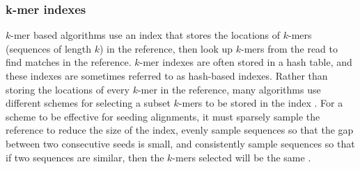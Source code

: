 \documentclass[11pt]{ucscthesis}
\begin{document}



\subsubsection{k-mer indexes}

$k$-mer based algorithms use an index that stores the locations of $k$-mers (sequences of length $k$) in the reference, then look up $k$-mers from the read to find matches in the reference.
$k$-mer indexes are often stored in a hash table, and these indexes are sometimes referred to as hash-based indexes.
Rather than storing the locations of every $k$-mer in the reference, many algorithms use different schemes for selecting a subset $k$-mers to be stored in the index \cite{li_minimap2_2018,lee_mosaik_2014,jain_mashmap_2018, edgar_urmap_2020,edgar_syncmers_2021}.
For a scheme to be effective for seeding alignments, it must sparsely sample the reference to reduce the size of the index, evenly sample sequences so that the gap between two consecutive seeds is small, and consistently sample sequences so that if two sequences are similar, then the $k$-mers selected will be the same \cite{marcais_improving_2017}.
\end{document}
